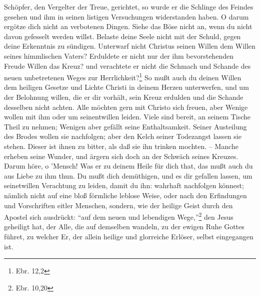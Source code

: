 Schöpfer, den Vergelter der Treue, gerichtet, so wurde er die Schlinge des
Feindes gesehen und ihm in seinen listigen Versuchungen widerstanden haben. O
darum ergötze dich nicht an verbotenen Dingen. Siehe das Böse nicht an, wenn du
nicht davon gefesselt werden willst. Belaste deine Seele nicht mit der Schuld,
gegen deine Erkenntnis zu sündigen. Unterwarf nicht Christus seinen Willen dem
Willen seines himmlischen Vaters? Erduldete er nicht nur der ihm bevorstehenden
Freude Willen das Kreuz? und verachtete er nicht die Schmach und Schande des
neuen unbetretenen Weges zur Herrlichkeit?\footnote{Ebr. 12,2} So mußt auch du
deinen Willen dem heiligen Gesetze und Lichte Christi in deinem Herzen
unterwerfen, und um der Belohnung willen, die er dir vorhält, sein Kreuz
erdulden und die Schande desselben nicht achten. Alle möchten gern mit Christo
sich freuen, aber Wenige wollen mit ihm oder um seinentwillen leiden. Viele sind
bereit, an seinem Tische Theil zu nehmen; Wenigen aber gefällt seine
Enthaltsamkeit. Seiner Austeilung des Brodes wollen sie nachfolgen; aber den
Kelch seiner Todezangst lassen sie stehen. Dieser ist ihnen zu bitter, als daß
sie ihn trinken mochten. -- Manche erheben seine Wunder, und ärgern sich doch an
der Schwäch seines Kreuzes. Darum höre, o ’Mensch! Was er zu deinem Heile für
dich that, das mußt auch du aus Liebe zu ihm thun. Du mußt dich demüthigen, und
es dir gefallen lassen, um seinetwillen Verachtung zu leiden, damit du ihn:
wahrhaft nachfolgen könnest; nämlich nicht auf eine bloß förmliche leblose
Weise, oder nach den Erfindungen und Vorschriften eitler Menschen, sondern, wie
der heilige Geist durch den Apostel sich ausdrückt: "`auf dem neuen und
lebendigen Wege,"'\footnote{Ebr. 10,20} den Jesus geheiligt hat, der Alle, die
auf demselben wandeln, zu der ewigen Ruhe Gottes führet, zu welcher Er, der
allein heilige und glorreiche Erlöser, selbst eingegangen ist.


